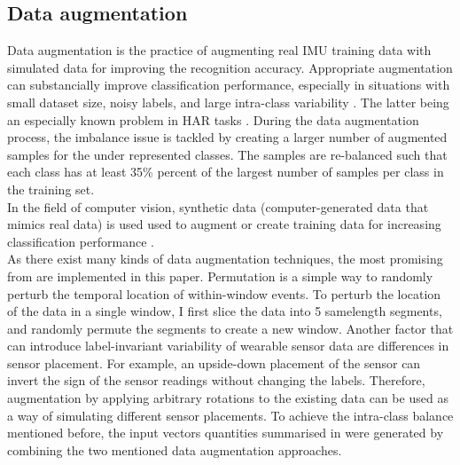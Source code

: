 \subsection{Data augmentation}
\label{sec:data_augmentation}
Data augmentation is the practice of augmenting real IMU training data with simulated data for improving the recognition accuracy. Appropriate augmentation can substancially improve classification performance, especially in situations with small dataset size, noisy labels, and large \mbox{intra-class} variability \cite{terry-2017}. The latter being an especially known problem in HAR tasks \cite{Andreas-2014}. During the data augmentation process, the imbalance issue is tackled by creating a larger number of augmented samples for the under represented classes. The samples are \mbox{re-balanced} such that each class has at least 35\% percent of the largest number of samples per class in the training set.\\
In the field of computer vision, synthetic data (\mbox{computer-generated} data that mimics real data) is used used to augment or create training data for increasing classification performance \cite{xi-2015}.\\
As there exist many kinds of data augmentation techniques, the most promising from \cite{terry-2017} are implemented in this paper. Permutation is a simple way to randomly perturb the temporal location of \mbox{within-window} events. To perturb the location of the data in a single window, I first slice the data into 5 samelength segments, and randomly permute the segments to create a new window. Another factor that can introduce \mbox{label-invariant} variability of wearable sensor data are differences in sensor placement. For example, an \mbox{upside-down} placement of the sensor can invert the sign of the sensor readings without changing the labels. Therefore, augmentation by applying arbitrary rotations to the existing data can be used as a way of simulating different sensor placements. To achieve the \mbox{intra-class} balance mentioned before, the input vectors quantities summarised in  were generated by combining the two mentioned data augmentation approaches.

